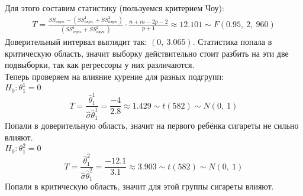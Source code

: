 \documentclass[12pt, a4paper]{article}
\begin{document}
Для этого составим статистику (пользуемся критерием Чоу):
\[
\begin{aligned}
    T = \frac{SS_{\text{случ.}} - \left( SS_{\text{случ.}}^1 + SS_{\text{случ.}}^2 \right)}{\left( SS_{\text{случ.}}^1 + SS_{\text{случ.}}^2 \right)} \cdot \frac{n + m - 2p - 2}{p + 1} \approx 12.101 \sim F(0.95,\ 2,\ 960)
\end{aligned}
\]
Доверительный интервал выглядит так: $(0,\ 3.065)$. Статистика попала в критическую область, значит выборку действительно стоит разбить на эти две подвыборки, так как регрессоры у них различаются.\\
Теперь проверяем на влияние курение для разных подгрупп:\\
$H_0: \theta_1^1 = 0$
\[
T = \frac{\hat \theta_1^1}{ \hat \sigma \hat \theta_1^1} = \frac{-4}{2.8} \approx 1.429 \sim t(582) \sim N(0,\ 1)
\]
Попали в доверительную область, значит на первого ребёнка сигареты не сильно влияют.\\
$H_0: \theta^2_1 = 0$
\[
T = \frac{\hat \theta_1^2}{ \hat \sigma \hat \theta_1^2} = \frac{-12.1}{3.1} \approx 3.903 \sim t(582) \sim N(0,\ 1)
\] 
Попали в критическую область, значит для этой группы сигареты влияют.
\end{document}
